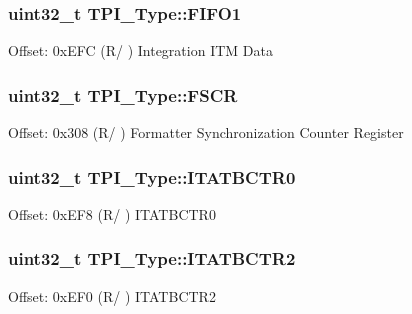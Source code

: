 \subsubsection[{\texorpdfstring{F\+I\+F\+O1}{FIFO1}}]{ uint32\+\_\+t T\+P\+I\+\_\+\+Type\+::\+F\+I\+F\+O1}\hypertarget{struct_t_p_i___type_aebaa9b8dd27f8017dd4f92ecf32bac8e}{}\label{struct_t_p_i___type_aebaa9b8dd27f8017dd4f92ecf32bac8e}
Offset\+: 0x\+E\+FC (R/ ) Integration I\+TM Data 
\subsubsection[{\texorpdfstring{F\+S\+CR}{FSCR}}]{ uint32\+\_\+t T\+P\+I\+\_\+\+Type\+::\+F\+S\+CR}\hypertarget{struct_t_p_i___type_a377b78fe804f327e6f8b3d0f37e7bfef}{}\label{struct_t_p_i___type_a377b78fe804f327e6f8b3d0f37e7bfef}
Offset\+: 0x308 (R/ ) Formatter Synchronization Counter Register 
\subsubsection[{\texorpdfstring{I\+T\+A\+T\+B\+C\+T\+R0}{ITATBCTR0}}]{ uint32\+\_\+t T\+P\+I\+\_\+\+Type\+::\+I\+T\+A\+T\+B\+C\+T\+R0}\hypertarget{struct_t_p_i___type_a20ca7fad4d4009c242f20a7b4a44b7d0}{}\label{struct_t_p_i___type_a20ca7fad4d4009c242f20a7b4a44b7d0}
Offset\+: 0x\+E\+F8 (R/ ) I\+T\+A\+T\+B\+C\+T\+R0 
\subsubsection[{\texorpdfstring{I\+T\+A\+T\+B\+C\+T\+R2}{ITATBCTR2}}]{ uint32\+\_\+t T\+P\+I\+\_\+\+Type\+::\+I\+T\+A\+T\+B\+C\+T\+R2}\hypertarget{struct_t_p_i___type_a176d991adb4c022bd5b982a9f8fa6a1d}{}\label{struct_t_p_i___type_a176d991adb4c022bd5b982a9f8fa6a1d}
Offset\+: 0x\+E\+F0 (R/ ) I\+T\+A\+T\+B\+C\+T\+R2 
